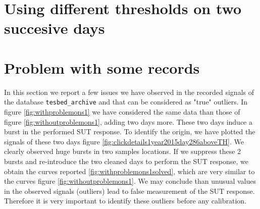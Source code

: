  \newpage\clearpage
\section{Using different thresholds on two succesive days}

\newpage\clearpage
\section{Problem with some records}
\label{ss:problems}
In this section we report a few issues we have observed in the recorded signals of the database {\tt tesbed\_archive} and that can be considered as "true" outliers.
In figure \ref{fig:withproblemons1} we have considered the same data than those of figure \ref{fig:withoutproblemons1}, adding two days more. These two days induce a burst in the performed SUT response. To identify the origin, we have plotted the signals of these two days figure \ref{fig:clickdetails1year2015day286aboveTH}. We clearly observed huge bursts in two samples locations. If we suppress these 2 bursts and re-introduce the two cleaned days to perform the SUT response, we obtain the curves reported \ref{fig:withproblemons1solved}, which are very similar to the curves figure \ref{fig:withoutproblemons1}. We may conclude than unusual values in the observed signals (outliers) lead to false measurement of the SUT response. Therefore it is very important to identify these outliers before any calibration.




